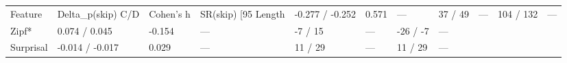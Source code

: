 \begin{tabular}{llllllll}
\toprule
Feature & Delta_p(skip) C/D & Cohen's h & SR(skip) [95%
\midrule
Length & -0.277 / -0.252 & 0.571 & — & 37 / 49 & — & 104 / 132 & — \\
Zipf* & 0.074 / 0.045 & -0.154 & — & -7 / 15 & — & -26 / -7 & — \\
Surprisal & -0.014 / -0.017 & 0.029 & — & 11 / 29 & — & 11 / 29 & — \\
\bottomrule
\end{tabular}

